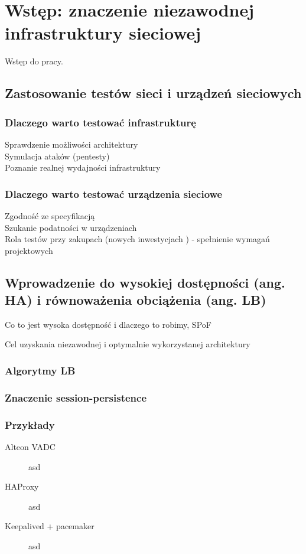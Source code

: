 
\chapter{Wstęp: znaczenie niezawodnej infrastruktury sieciowej}

Wstęp do pracy.

\section{Zastosowanie testów sieci i urządzeń sieciowych}
\subsection{Dlaczego warto testować infrastrukturę}

Sprawdzenie możliwości architektury\\
Symulacja ataków (pentesty)\\
Poznanie realnej wydajności infrastruktury


\subsection{Dlaczego warto testować urządzenia sieciowe}

Zgodność ze specyfikacją \\
Szukanie podatności w urządzeniach \\
Rola testów przy zakupach (nowych inwestycjach ) - spełnienie wymagań projektowych


\section{Wprowadzenie do wysokiej dostępności (ang. \gls{HA}) i równoważenia obciążenia (ang. \gls{LB})}



Co to jest wysoka dostępność i dlaczego to robimy, SPoF

Cel uzyskania niezawodnej i optymalnie wykorzystanej architektury


\subsection{Algorytmy \gls{LB}}

\subsection{Znaczenie session-persistence}

\subsection{Przykłady}

\begin{description}
\item[Alteon VADC] asd
\item[HAProxy] asd
\item[Keepalived + pacemaker] asd
\end{description}